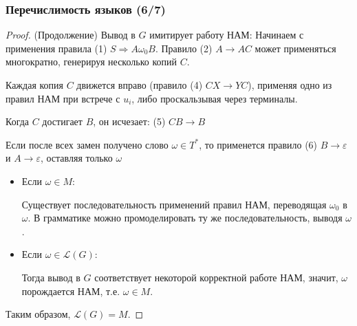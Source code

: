 \begin{frame}
    \frametitle{Перечислимость языков (6/7)}

    \begin{proof} (Продолжение)
        Вывод в $ G $ имитирует работу НАМ:
        Начинаем с применения правила (1) $ S \Rightarrow A \omega_0 B $. Правило (2) $ A \to A C $ может применяться многократно, генерируя несколько копий $ C $.

        Каждая копия $ C $ движется вправо (правило (4) $ C X \to Y C $), применяя одно из правил НАМ при встрече с $ u_i $, либо проскальзывая через терминалы.

        Когда $ C $ достигает $ B $, он исчезает: (5) $ C B \to B $

        Если после всех замен получено слово $ \omega \in T^* $, то применется правило (6) $ B \to \varepsilon $ и $ A \to \varepsilon $, оставляя только $ \omega $
        \begin{itemize}
            \item Если $ \omega \in M $:

                  Существует последовательность применений правил НАМ, переводящая $ \omega_0 $ в $ \omega $. В грамматике можно промоделировать ту же последовательность, выводя $ \omega $.
            \item Если $ \omega \in \mathcal{L}(G) $:

                  Тогда вывод в $ G $ соответствует некоторой корректной работе НАМ, значит, $ \omega $ порождается НАМ, т.е. $ \omega \in M $.

        \end{itemize}




        Таким образом, $ \mathcal{L}(G) = M $.

    \end{proof}


\end{frame}


